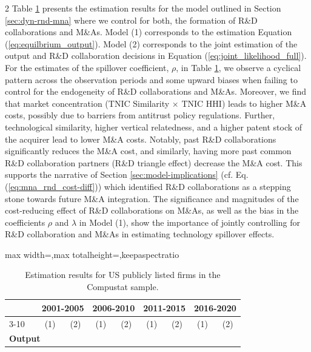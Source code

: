 \documentclass[12pt]{article}
\begin{document}
\begin{spacing}{2}
Table \ref{tab:result_output_US_compustat_NAICS_6_mna} presents the estimation results for the model outlined in Section \ref{sec:dyn-rnd-mna} where we control for both, the formation of R\&D collaborations and M\&As. Model (1) corresponds to the estimation Equation (\ref{eq:equilbrium_output}). Model (2) corresponds to the joint estimation of the output and R\&D collaboration decisions in Equation (\ref{eq:joint_likelihood_full}). For the estimates of the spillover coefficient, $\rho$, in Table \ref{tab:result_output_US_compustat_NAICS_6_mna}, we observe a cyclical pattern across the observation periods and some upward biases when failing to control for the endogeneity of R\&D collaborations and M\&As. Moreover, we find that market concentration (TNIC Similarity $\times$ TNIC HHI) leads to higher M\&A  costs, possibly due to barriers from antitrust policy regulations. Further, technological similarity, higher vertical relatedness, and a higher patent stock of the acquirer lead to lower M\&A costs. Notably, past R\&D collaborations significantly reduces the M\&A cost, and similarly, having more past common R\&D collaboration partners (R\&D triangle effect) decrease the M\&A cost. This supports the narrative of Section \ref{sec:model-implications} (cf. Eq. (\ref{eq:mna_rnd_cost-diff})) which identified R\&D collaborations as a stepping stone towards future M\&A integration. The significance and magnitudes of the cost-reducing effect of R\&D collaborations on M\&As, as well as the bias in the coefficients $\rho$ and $\lambda$ in Model (1), show the importance of jointly controlling for R\&D collaboration and M\&As in estimating technology spillover effects.
\begin{table}[tbp]
  \small
  \centering
    \begin{center}
        \begin{adjustbox}{max width=\textwidth,max totalheight=\textheight,keepaspectratio}
\begin{threeparttable}
\caption{\label{tab:result_output_US_compustat_NAICS_6_mna} Estimation results for US publicly listed firms in the Compustat sample.}
    \begin{tabular}{llcccccccc}
    \toprule
          & & \multicolumn{2}{c}{2001-2005} & \multicolumn{2}{c}{2006-2010} & \multicolumn{2}{c}{2011-2015} & \multicolumn{2}{c}{2016-2020} \\
          \cmidrule{3-10}
          & & (1)  & (2) & (1)  & (2) & (1)  & (2) & (1)  & (2) \\
    \midrule
    \multicolumn{6}{l}{\bf Output} \\

\end{tabular}
\end{threeparttable}
\end{adjustbox}
\end{center}
\end{table}
\end{spacing}
\end{document}
